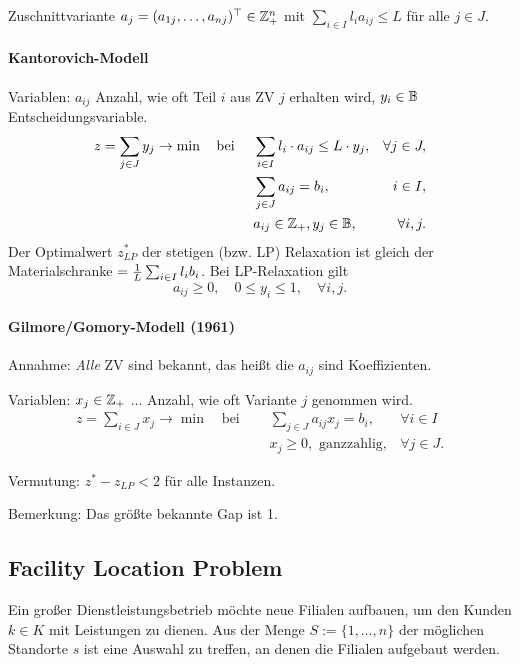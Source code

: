 Zuschnittvariante $a_j = (a_{1j}, \ldots, a_{nj})^\top \in \mathbb{Z}_+^n$ mit
$\sum_{i \in I} l_i a_{ij} \le L$ für alle $j \in J$.

\paragraph{Kantorovich-Modell}
Variablen: $a_{ij}$ Anzahl, wie oft Teil $i$ aus ZV $j$ erhalten wird, $y_i
\in \mathbb{B}$ Entscheidungsvariable.
\[ \begin{aligned}
    z &= \sum_{j \in J} y_j \to \min \quad \text{bei } &
    &\sum_{i \in I} l_i \cdot a_{ij} \le L \cdot y_j, & \forall j \in J, \\
    & &
    &\sum_{j \in J} a_{ij} = b_i, & i \in I, \\
    & &
    &a_{ij} \in \mathbb{Z}_+, y_j \in \mathbb{B}, & \forall i,j.
  \end{aligned} \]
Der Optimalwert $z_{LP}^*$ der stetigen (bzw. LP) Relaxation ist gleich der
Materialschranke $= \frac{1}{L} \sum_{i \in I} l_i b_i$. Bei LP-Relaxation gilt
\[ a_{ij} \ge 0, \quad 0 \le y_i \le 1, \quad \forall i, j. \]

\paragraph{Gilmore/Gomory-Modell (1961)}
Annahme: \emph{Alle} ZV sind bekannt, das heißt die $a_{ij}$ sind Koeffizienten.

Variablen: $x_j \in \mathbb{Z}_+$ ... Anzahl, wie oft Variante $j$ genommen wird.
\[ \begin{aligned}
    z = \sum_{i \in J} x_j \to \min \quad \text{bei } \quad
    &\sum_{j \in J} a_{ij} x_j = b_i, & \forall i \in I \\
    &x_j \ge 0, \text{ ganzzahlig}, & \forall j \in J.
  \end{aligned} \]

Vermutung: $z^* - z_{LP} < 2$ für alle Instanzen.

Bemerkung: Das größte bekannte Gap ist 1.

\subsection{Facility Location Problem}
Ein großer Dienstleistungsbetrieb möchte neue Filialen aufbauen, um den Kunden
$k \in K$ mit Leistungen zu dienen. Aus der Menge $S := \{1, \ldots, n\}$ der
möglichen Standorte $s$ ist eine Auswahl zu treffen, an denen die Filialen
aufgebaut werden.

